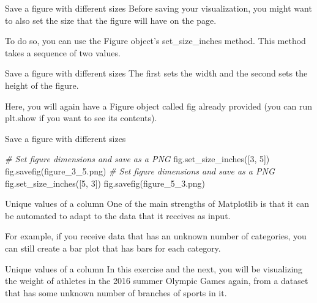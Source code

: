 \documentclass[
  ignorenonframetext,
]{beamer}
\newenvironment{Shaded}{\begin{snugshade}}{\end{snugshade}}
\newcommand{\CommentTok}[1]{\textcolor[rgb]{0.56,0.35,0.01}{\textit{#1}}}
\newcommand{\DecValTok}[1]{\textcolor[rgb]{0.00,0.00,0.81}{#1}}
\newcommand{\NormalTok}[1]{#1}
\newcommand{\StringTok}[1]{\textcolor[rgb]{0.31,0.60,0.02}{#1}}
\begin{document}
\begin{frame}{Save a figure with different sizes}
\label{save-a-figure-with-different-sizes}
Before saving your visualization, you might want to also set the size
that the figure will have on the page.

To do so, you can use the Figure object's set\_size\_inches method. This
method takes a sequence of two values.
\end{frame}

\begin{frame}{Save a figure with different sizes}
\label{save-a-figure-with-different-sizes-1}
The first sets the width and the second sets the height of the figure.

Here, you will again have a Figure object called fig already provided
(you can run plt.show if you want to see its contents).
\end{frame}

\begin{frame}[fragile]{Save a figure with different sizes}
\label{save-a-figure-with-different-sizes-2}

\begin{Shaded}
\begin{Highlighting}[]
\CommentTok{\# Set figure dimensions and save as a PNG}
\NormalTok{fig.set\_size\_inches([}\DecValTok{3}\NormalTok{, }\DecValTok{5}\NormalTok{])}
\NormalTok{fig.savefig(}\StringTok{\textquotesingle{}figure\_3\_5.png\textquotesingle{}}\NormalTok{)}
\CommentTok{\# Set figure dimensions and save as a PNG}
\NormalTok{fig.set\_size\_inches([}\DecValTok{5}\NormalTok{, }\DecValTok{3}\NormalTok{])}
\NormalTok{fig.savefig(}\StringTok{\textquotesingle{}figure\_5\_3.png\textquotesingle{}}\NormalTok{)}
\end{Highlighting}
\end{Shaded}
\end{frame}

\begin{frame}{Unique values of a column}
\label{unique-values-of-a-column}
One of the main strengths of Matplotlib is that it can be automated to
adapt to the data that it receives as input.

For example, if you receive data that has an unknown number of
categories, you can still create a bar plot that has bars for each
category.
\end{frame}

\begin{frame}{Unique values of a column}
\label{unique-values-of-a-column-1}
In this exercise and the next, you will be visualizing the weight of
athletes in the 2016 summer Olympic Games again, from a dataset that has
some unknown number of branches of sports in it.
\end{frame}
\end{document}
